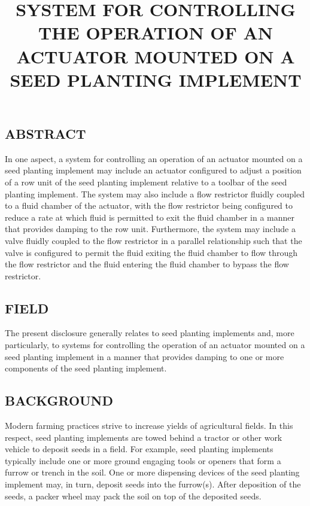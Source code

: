 \documentclass[11pt,a4paper]{article}
\title{SYSTEM FOR CONTROLLING THE OPERATION OF AN ACTUATOR MOUNTED ON A SEED PLANTING IMPLEMENT}
\begin{document}
\maketitle

\subsection{ABSTRACT}

In one aspect, a system for controlling an operation of an actuator mounted on a seed planting implement may include an actuator configured to adjust a position of a row unit of the seed planting implement relative to a toolbar of the seed planting implement. The system may also include a flow restrictor fluidly coupled to a fluid chamber of the actuator, with the flow restrictor being configured to reduce a rate at which fluid is permitted to exit the fluid chamber in a manner that provides damping to the row unit. Furthermore, the system may include a valve fluidly coupled to the flow restrictor in a parallel relationship such that the valve is configured to permit the fluid exiting the fluid chamber to flow through the flow restrictor and the fluid entering the fluid chamber to bypass the flow restrictor.

\subsection{FIELD}

The present disclosure generally relates to seed planting implements and, more particularly, to systems for controlling the operation of an actuator mounted on a seed planting implement in a manner that provides damping to one or more components of the seed planting implement.

\subsection{BACKGROUND}

Modern farming practices strive to increase yields of agricultural fields. In this respect, seed planting implements are towed behind a tractor or other work vehicle to deposit seeds in a field. For example, seed planting implements typically include one or more ground engaging tools or openers that form a furrow or trench in the soil. One or more dispensing devices of the seed planting implement may, in turn, deposit seeds into the furrow(s). After deposition of the seeds, a packer wheel may pack the soil on top of the deposited seeds.
\end{document}
